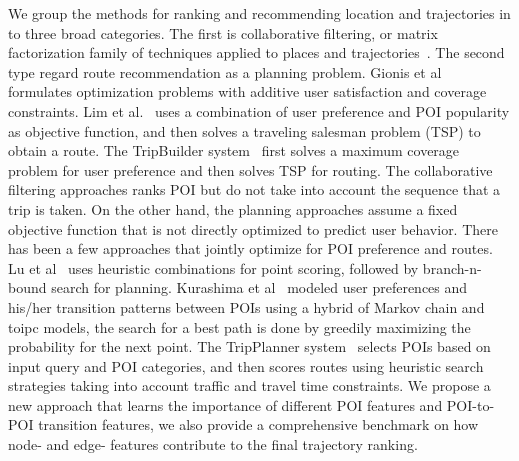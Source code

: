 We group the methods for ranking and recommending location and trajectories in to three broad categories. 
The first is collaborative filtering, or matrix factorization family of techniques applied to places and trajectories~\cite{shi2011personalized,ijcai13,zhang2015location}. The second type regard route recommendation as a planning problem. Gionis et al~\cite{wsdm14} formulates optimization problems with additive user satisfaction and coverage constraints. Lim et al.~\cite{ijcai15} uses a combination of user preference and POI popularity as objective function, and then solves a traveling salesman problem (TSP) to obtain a route. 
The TripBuilder system~\cite{brilhante2013shall} first solves a maximum coverage problem for user preference and then solves TSP for routing. The collaborative filtering approaches ranks POI but do not take into account the sequence that a trip is taken. On the other hand, the planning approaches assume a fixed objective function that is not directly optimized to predict user behavior. There has been a few approaches that jointly optimize for POI preference and routes. Lu et al~\cite{lu2012personalized} uses heuristic combinations for point scoring, followed by branch-n-bound search for planning. Kurashima et al~\cite{kurashima2010geotag} modeled user preferences and his/her transition patterns between POIs using a hybrid of Markov chain and toipc models, the search for a best path is done by greedily maximizing the probability for the next point. The TripPlanner system~\cite{chen2015tripplanner} selects POIs based on input query and POI categories, and then scores routes using heuristic search strategies taking into account traffic and travel time constraints. 
We propose a new approach that learns the importance of different POI features and POI-to-POI transition features, we also provide a comprehensive benchmark on how node- and edge- features contribute to the final trajectory ranking. 



